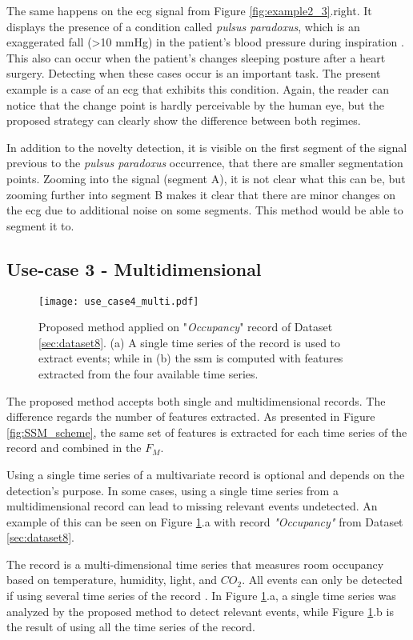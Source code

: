{The same happens on the \gls{ecg} signal from Figure \ref{fig:example2_3}.right. It displays the presence of a condition called \textit{pulsus paradoxus}, which is an exaggerated fall (>10 mmHg) in the patient's blood pressure during inspiration \cite{pulsusparadoxus2}. This also can occur when the patient's changes sleeping posture after a heart surgery\cite{eamonn_segmentation}. Detecting when these cases occur is an important task. The present example is a case of an \gls{ecg} that exhibits this condition.
Again, the reader can notice that the change point is hardly perceivable by the human eye, but the proposed strategy can clearly show the difference between both regimes.
\par
In addition to the novelty detection, it is visible on the first segment of the signal previous to the \textit{pulsus paradoxus} occurrence, that there are smaller segmentation points. Zooming into the signal (segment A), it is not clear what this can be, but zooming further into segment B makes it clear that there are minor changes on the \gls{ecg} due to additional noise on some segments. This method would be able to segment it to.

\subsection{Use-case 3 - Multidimensional}

\begin{figure}
    \centering
    \texttt{[image: use\_case4\_multi.pdf]}
    \caption{Proposed method applied on "\textit{Occupancy}" record of Dataset \ref{sec:dataset8}. (a) A single time series of the record is used to extract events; while in (b) the \gls{ssm} is computed with features extracted from the four available time series.}
    \label{fig:example4}
\end{figure}

The proposed method accepts both single and multidimensional records. The difference regards the number of features extracted. As presented in Figure \ref{fig:SSM_scheme}, the same set of features is extracted for each time series of the record and combined in the $F_M$. 
\par
Using a single time series of a multivariate record is optional and depends on the detection's purpose. In some cases, using a single time series from a multidimensional record can lead to missing relevant events undetected. An example of this can be seen on Figure \ref{fig:example4}.a with record \textit{"Occupancy"} from Dataset \ref{sec:dataset8}. 
\par
The record is a multi-dimensional time series that measures room occupancy based on temperature, humidity, light, and $CO_2$. All events can only be detected if using several time series of the record \cite{cpd_alan}. In Figure \ref{fig:example4}.a, a single time series was analyzed by the proposed method to detect relevant events, while Figure \ref{fig:example4}.b is the result of using all the time series of the record.


}
